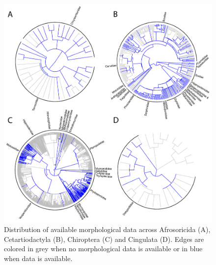 \begin{figure}[!ht]
\centering
    \includegraphics[width=\textwidth]{Supplementaries/Figures/MissingMammals/Combined_phy1.pdf}
\caption[Available data in Afrosoricida, Cetartiodactyla, Chiroptera and Dasyuromorphia]{Distribution of available morphological data across Afrosoricida (A), Cetartiodactyla (B), Chiroptera (C) and Cingulata (D). Edges are colored in grey when no morphological data is available or in blue when data is available.}
\label{Supp_combined_phy1}
\end{figure}

